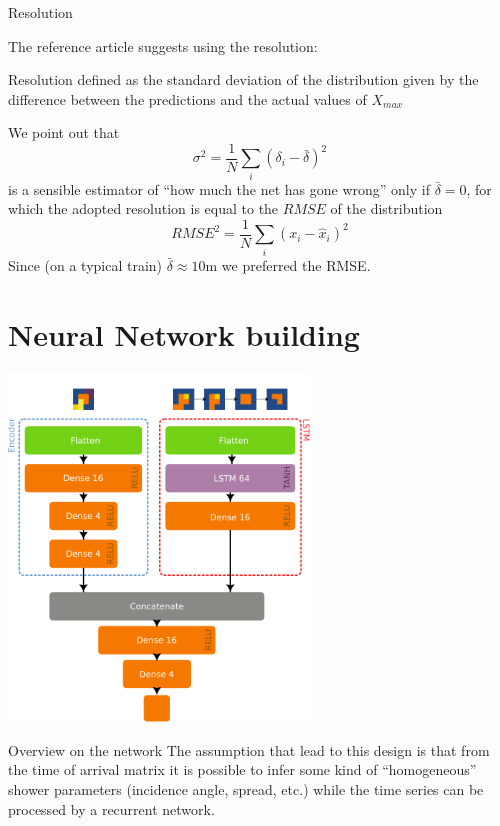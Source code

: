 \documentclass{beamer}
\begin{document}
\begin{frame}{Resolution}

    The reference article suggests using the resolution:
    \begin{block}{Resolution}
        defined as the standard deviation of the distribution given by the difference between the predictions and the actual values of $X_{max}$
    \end{block}

    We point out that 
    \[\sigma^2 = \frac{1}{N}\sum_i (\delta_i - \bar{\delta})^2\]
    is a sensible estimator of ``how much the net has gone wrong'' only if $\bar{\delta} = 0$, for which the adopted resolution is equal 
    to the $RMSE$ of the distribution
    \[ RMSE^2 = \frac{1}{N}\sum_i(x_i - \hat{x}_i)^2 \]
    Since (on a typical train) $\bar{\delta} \approx 10$m we preferred the RMSE.
\end{frame}



\section{Neural Network building}

    \centering
    \includegraphics[width=0.6\textwidth]{model.pdf}
\begin{frame}{Overview on the network}
    The assumption that lead to this design is that from the time of arrival matrix
    it is possible to infer some kind of ``homogeneous'' shower parameters (incidence angle, spread, etc.)
    while the time series can be processed by a recurrent network.
\end{frame}
\end{document}
